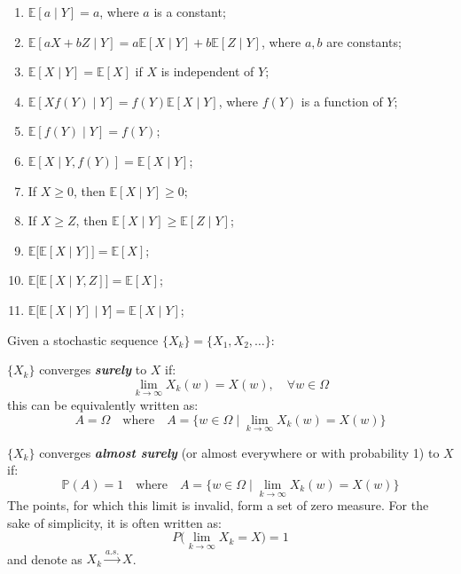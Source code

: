 \documentclass[10pt]{elegantbook}
\newcommand{\mydefination}[1]{\textbf{\textit{\textcolor{structurecolor}{#1}}}}
\begin{document}
\begin{lemma}
    \begin{enumerate}
        \item $\mathbb E[a \mid Y] = a$, where $a$ is a constant;
        \item $\mathbb E[aX + bZ \mid Y] = a \mathbb E[X \mid Y] + b \mathbb E[Z \mid Y]$, where $a, b$ are constants;
        \item $\mathbb E[X \mid Y] = \mathbb E[X]$ if $X$ is independent of $Y$;
        \item $\mathbb E[Xf(Y) \mid Y] = f(Y) \mathbb E[X \mid Y]$, where $f(Y)$ is a function of $Y$;
        \item $\mathbb E[f(Y) \mid Y] = f(Y)$;
        \item $\mathbb E[X \mid Y, f(Y)] = \mathbb E[X \mid Y]$;
        \item If $X \geq 0$, then $\mathbb E[X \mid Y] \geq 0$;
        \item If $X \geq Z$, then $\mathbb E[X \mid Y] \geq \mathbb E[Z \mid Y]$;
        \item $\mathbb E \big [ \mathbb E[X \mid Y] \big ] = \mathbb E[X]$;
        \item $\mathbb E \big [ \mathbb E[X \mid Y, Z] \big ] = \mathbb E[X]$;
        \item $\mathbb E \big [ \mathbb E[X \mid Y] \mid Y \big ] = \mathbb E[X \mid Y]$;
    \end{enumerate}
\end{lemma}

Given a stochastic sequence $\{ X_k \} = \{ X_1, X_2, \ldots \}$:
\begin{definition}
    $\{ X_k \}$ converges \mydefination{surely} to $X$ if:
    \[ \lim_{k \rightarrow \infty} X_k(w) = X(w), \quad \forall w \in \Omega \]
    this can be equivalently written as:
    \[ A = \Omega \quad \text{where} \quad A = \{ w \in \Omega \mid \lim_{k \rightarrow \infty} X_k(w) = X(w) \} \]
\end{definition}

\begin{definition}
    $\{ X_k \}$ converges \mydefination{almost surely} (or almost everywhere or with probability 1) to $X$ if:
    \[ \mathbb P(A) = 1 \quad \text{where} \quad A = \{ w \in \Omega \mid \lim_{k \rightarrow \infty} X_k(w) = X(w) \} \]
    The points, for which this limit is invalid, form a set of zero measure. For the sake of simplicity, it is often written as:
    \[ P \big ( \lim_{k \rightarrow \infty} X_k = X \big ) = 1 \]
    and denote as $X_k \xrightarrow{a.s.} X$.
\end{definition}
\end{document}
